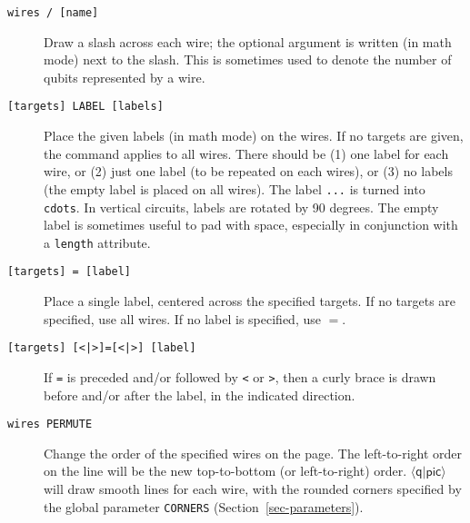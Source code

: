 \documentclass[twoside,12pt]{article}
\newcommand{\qpic}{$\langle\mathsf{q}|\mathsf{pic}\rangle$\xspace}
\begin{document}
\begin{description}
\item[{\tt wires / [name]}] Draw a slash across each wire; the optional argument is written (in math mode) next to the
slash.  This is sometimes used to denote the number of qubits represented by a wire.

\begin{minipage}[b]{2in}

\end{minipage} \hfill 

\item[{\tt [targets] LABEL [labels]}] Place the given labels (in math mode) on the wires.
  If no targets are given, the command applies to all wires.
  There should be (1) one label for each wire,
  or (2) just one label (to be repeated on each wires),
  or (3) no labels (the empty label is placed on all wires).  The label {\tt ...}
  is turned into {\tt {} cdots}.
  In vertical circuits, labels are rotated by 90 degrees.
  The empty label is sometimes useful to pad with space, especially in conjunction
  with a {\tt length} attribute.
  
\begin{minipage}[b]{2in}

\end{minipage} \hfill 

\item[{\tt [targets] = [label]}] Place a single label, centered across the specified targets.  If no targets are specified, use all wires.  If no label is specified, use $=$.

\begin{minipage}[b]{2in}

\end{minipage} \hfill 

\item[{\tt [targets] [<|>]=[<|>] [label]}] If {\tt =} is preceded and/or followed by
  {\tt <} or {\tt >}, then a curly brace is drawn before and/or after the label, in the
  indicated direction.

\begin{minipage}[b]{2in}

\end{minipage} \hfill 

\item[{\tt wires PERMUTE}] Change the order of the specified wires on the page.  The
  left-to-right order on the line will be the new top-to-bottom (or left-to-right) order.
  \qpic will draw smooth lines for each wire, with the rounded corners specified by
  the global parameter {\tt CORNERS} (Section~\ref{sec-parameters}).

\begin{minipage}[b]{2in}

\end{minipage} \hfill 

  
\end{description}
\end{document}
